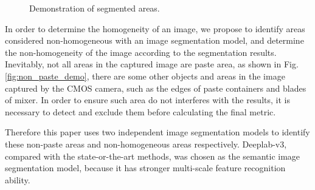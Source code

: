 \documentclass[pdflatex,sn-mathphys]{sn-jnl}%
\theoremstyle{thmstyleone}%
\theoremstyle{thmstyletwo}%
\theoremstyle{thmstylethree}%
\begin{document}
\begin{figure}
    \centering
    \hfill
    \hfill
    \caption{Demonstration of segmented areas.}
\end{figure}


In order to determine the homogeneity of an image, we propose to identify areas considered non-homogeneous with an image segmentation model, and determine the non-homogeneity of the image according to the segmentation results. 
Inevitably, not all areas in the captured image are paste area, as shown in Fig. \ref{fig:non_paste_demo}, there are some other objects and areas in the image captured by the CMOS camera, such as the edges of paste containers and blades of mixer. 
In order to ensure such area do not interferes with the results, it is necessary to detect and exclude them before calculating the final metric.      


Therefore this paper uses two independent image segmentation models to identify these non-paste areas and non-homogeneous areas respectively. 
Deeplab-v3, compared with the state-or-the-art methods\cite{swin,ronneberger2015u,Chen2017RethinkingAC}, was chosen as the semantic image segmentation model, because it has stronger multi-scale feature recognition ability.
\par
\end{document}
